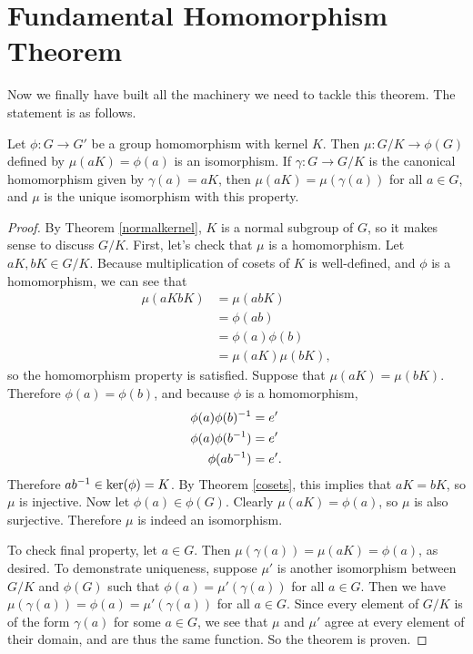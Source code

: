 \section{Fundamental Homomorphism Theorem}

Now we finally have built all the machinery we need to tackle this theorem. The statement is as follows.

\begin{theorem}
Let $\phi: G \to G'$ be a group homomorphism with kernel $K$. Then $\mu: G/K \to \phi(G)$ defined by $\mu(aK) = \phi(a)$ is an isomorphism. If $\gamma: G \to G/K$ is the canonical homomorphism given by $\gamma(a) = aK$, then $\mu(aK) = \mu(\gamma(a))$ for all $a \in G$, and $\mu$ is the unique isomorphism with this property.
\end{theorem}

\begin{proof}
By Theorem \ref{normalkernel}, $K$ is a normal subgroup of $G$, so it makes sense to discuss $G/K$. First, let's check that $\mu$ is a homomorphism. Let $aK, bK \in G/K$. Because multiplication of cosets of $K$ is well-defined, and $\phi$ is a homomorphism, we can see that
\begin{align*}
    \mu(aKbK) &= \mu(abK) \\
    &= \phi(ab) \\
    &= \phi(a)\phi(b) \\
    &= \mu(aK)\mu(bK)\mathrm{,}
\end{align*}
so the homomorphism property is satisfied. Suppose that $\mu(aK) = \mu(bK).$ Therefore $\phi(a) = \phi(b)$, and because $\phi$ is a homomorphism,
\begin{align*}
    \phi(a)\phi(b)^{-1} &= e' \\
    \phi(a)\phi(b^{-1}) &= e' \\
    \phi(ab^{-1}) &= e'\mathrm{.}
\end{align*}
Therefore $ab^{-1} \in \ker(\phi) = K$. By Theorem \ref{cosets}, this implies that $aK = bK$, so $\mu$ is injective. Now let $\phi(a) \in \phi(G)$. Clearly $\mu(aK) = \phi(a)$, so $\mu$ is also surjective. Therefore $\mu$ is indeed an isomorphism.

To check final property, let $a \in G$. Then $\mu(\gamma(a)) = \mu(aK) = \phi(a)$, as desired. To demonstrate uniqueness, suppose $\mu'$ is another isomorphism between $G/K$ and $\phi(G)$ such that $\phi(a) = \mu'(\gamma(a))$ for all $a \in G$. Then we have $\mu(\gamma(a)) = \phi(a) = \mu'(\gamma(a))$ for all $a \in G$. Since every element of $G/K$ is of the form $\gamma(a)$ for some $a \in G$, we see that $\mu$ and $\mu'$ agree at every element of their domain, and are thus the same function. So the theorem is proven.

\end{proof}

